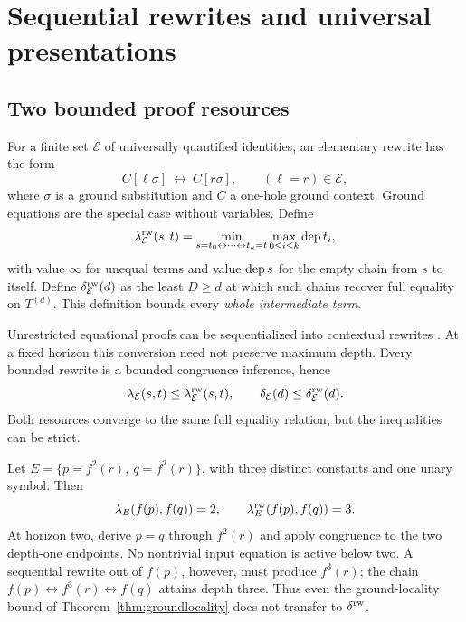 \section{Sequential rewrites and universal presentations}\label{sec:universal}

\subsection{Two bounded proof resources}\label{sec:rewrite}
For a finite set $\mathcal E$ of universally quantified identities, an elementary rewrite has the form
\[
C[\ell\sigma]\ \longleftrightarrow\ C[r\sigma],
\qquad (\ell=r)\in\mathcal E,
\]
where $\sigma$ is a ground substitution and $C$ a one-hole ground context. Ground equations are the special case without variables. Define
\[
\lambda^{\mathrm{rw}}_{\mathcal E}(s,t)=
\min_{s=t_0\leftrightarrow\cdots\leftrightarrow t_k=t}
\max_{0\le i\le k}\operatorname{dep} t_i,
\]
with value $\infty$ for unequal terms and value $\operatorname{dep} s$ for the empty chain from $s$ to itself. Define $\delta^{\mathrm{rw}}_{\mathcal E}(d)$ as the least $D\ge d$ at which such chains recover full equality on $T^{(d)}$. This definition bounds every \emph{whole intermediate term}.

Unrestricted equational proofs can be sequentialized into contextual rewrites \cite{BurrisSankappanavar1981}. At a fixed horizon this conversion need not preserve maximum depth. Every bounded rewrite is a bounded congruence inference, hence
\begin{equation}\label{eq:tworesources}
\lambda_{\mathcal E}(s,t)\le\lambda^{\mathrm{rw}}_{\mathcal E}(s,t),
\qquad
\delta_{\mathcal E}(d)\le\delta^{\mathrm{rw}}_{\mathcal E}(d).
\end{equation}
Both resources converge to the same full equality relation, but the inequalities can be strict.

\begin{example}\label{ex:gap}
Let $E=\{p=f^2(r),\ q=f^2(r)\}$, with three distinct constants and one unary symbol. Then
\[
\lambda_E(f(p),f(q))=2,
\qquad
\lambda^{\mathrm{rw}}_E(f(p),f(q))=3.
\]
At horizon two, derive $p=q$ through $f^2(r)$ and apply congruence to the two depth-one endpoints. No nontrivial input equation is active below two. A sequential rewrite out of $f(p)$, however, must produce $f^3(r)$; the chain $f(p)\leftrightarrow f^3(r)\leftrightarrow f(q)$ attains depth three. Thus even the ground-locality bound of Theorem~\ref{thm:groundlocality} does not transfer to $\delta^{\mathrm{rw}}$.
\end{example}

